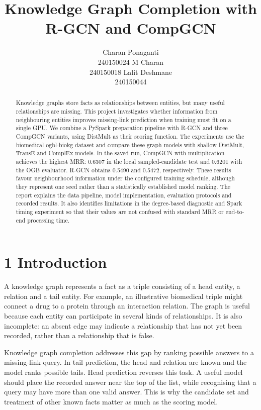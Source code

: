 \documentclass[11pt]{article}
\title{Knowledge Graph Completion with R-GCN and CompGCN}
\author{Charan Ponaganti \\ 240150024 \And M Charan \\ 240150018 \And Lalit Deshmane \\ 240150044}
\begin{document}
\maketitle
\begin{abstract}
Knowledge graphs store facts as relationships between entities, but many useful relationships are missing. This project investigates whether information from neighbouring entities improves missing-link prediction when training must fit on a single GPU. We combine a PySpark preparation pipeline with R-GCN and three CompGCN variants, using DistMult as their scoring function. The experiments use the biomedical ogbl-biokg dataset and compare these graph models with shallow DistMult, TransE and ComplEx models. In the saved run, CompGCN with multiplication achieves the highest MRR: 0.6307 in the local sampled-candidate test and 0.6201 with the OGB evaluator. R-GCN obtains 0.5490 and 0.5472, respectively. These results favour neighbourhood information under the configured training schedule, although they represent one seed rather than a statistically established model ranking. The report explains the data pipeline, model implementation, evaluation protocols and recorded results. It also identifies limitations in the degree-based diagnostic and Spark timing experiment so that their values are not confused with standard MRR or end-to-end processing time.

\end{abstract}
\section*{1 Introduction}
A knowledge graph represents a fact as a triple consisting of a head entity, a relation and a tail entity. For example, an illustrative biomedical triple might connect a drug to a protein through an interaction relation. The graph is useful because each entity can participate in several kinds of relationships. It is also incomplete: an absent edge may indicate a relationship that has not yet been recorded, rather than a relationship that is false.

Knowledge graph completion addresses this gap by ranking possible answers to a missing-link query. In tail prediction, the head and relation are known and the model ranks possible tails. Head prediction reverses this task. A useful model should place the recorded answer near the top of the list, while recognising that a query may have more than one valid answer. This is why the candidate set and treatment of other known facts matter as much as the scoring model.
\end{document}

